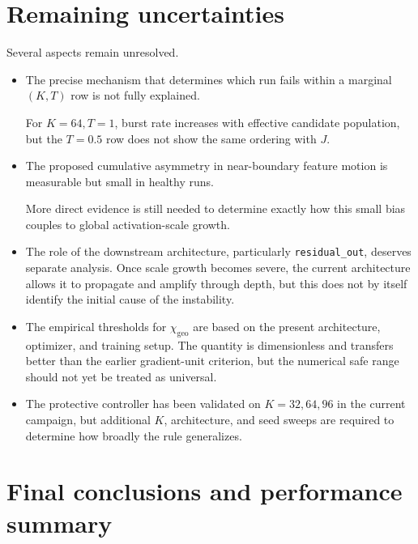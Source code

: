 \documentclass[11pt,a4paper]{article}
\newcommand{\code}[1]{\texttt{#1}}
\newcommand{\chigeo}{\chi_{\mathrm{geo}}}
\begin{document}
\section{Remaining uncertainties}

Several aspects remain unresolved.

\begin{itemize}[leftmargin=1.4em]

\item
The precise mechanism that determines which run fails within a marginal
\((K,T)\) row is not fully explained.

For \(K=64,T=1\), burst rate increases with effective candidate population,
but the \(T=0.5\) row does not show the same ordering with \(J\).

\item
The proposed cumulative asymmetry in near-boundary feature motion is measurable
but small in healthy runs.

More direct evidence is still needed to determine exactly how this small bias
couples to global activation-scale growth.

\item
The role of the downstream architecture, particularly
\code{residual\_out}, deserves separate analysis.
Once scale growth becomes severe, the current architecture allows it to
propagate and amplify through depth, but this does not by itself identify the
initial cause of the instability.

\item
The empirical thresholds for \(\chigeo\) are based on the present architecture,
optimizer, and training setup.
The quantity is dimensionless and transfers better than the earlier
gradient-unit criterion, but the numerical safe range should not yet be
treated as universal.

\item
The protective controller has been validated on \(K=32,64,96\) in the current
campaign, but additional \(K\), architecture, and seed sweeps are required to
determine how broadly the rule generalizes.

\end{itemize}


\section{Final conclusions and performance summary}
\end{document}
